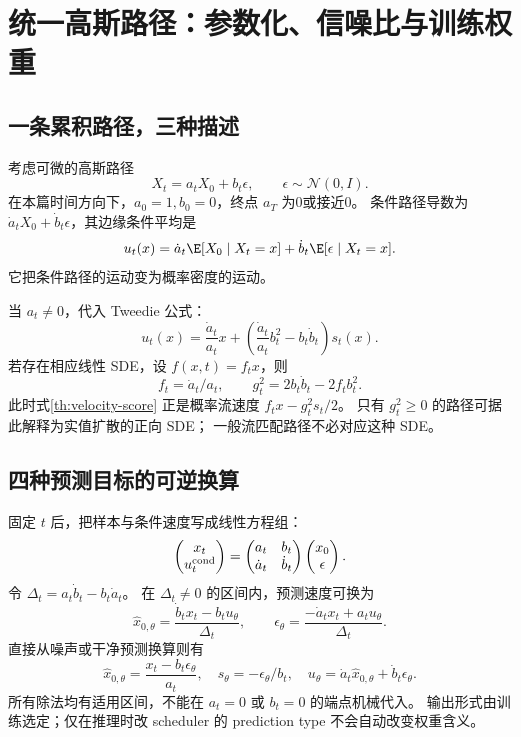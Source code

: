 \chapter{统一高斯路径：参数化、信噪比与训练权重}
\label{th:unification}

\section{一条累积路径，三种描述}

考虑可微的高斯路径
\begin{equation}\label{th:affine-path}
X_t=a_tX_0+b_t\epsilon,\qquad \epsilon\sim\mathcal N(0,I).
\end{equation}
在本篇时间方向下，$a_0=1,b_0=0$，终点 $a_T$ 为0或接近0。
条件路径导数为 $\dot a_tX_0+\dot b_t\epsilon$，其边缘条件平均是
\begin{equation}\label{th:marginal-velocity}
u_t(x)=\dot a_t\E[X_0\mid X_t=x]+\dot b_t\E[\epsilon\mid X_t=x].
\end{equation}
它把条件路径的运动变为概率密度的运动。

当 $a_t\ne0$，代入 Tweedie 公式：
\begin{equation}\label{th:velocity-score}
u_t(x)=\frac{\dot a_t}{a_t}x+
 \left(\frac{\dot a_t}{a_t}b_t^2-b_t\dot b_t\right)s_t(x).
\end{equation}
若存在相应线性 SDE，设 $f(x,t)=f_t x$，则
\[
f_t=\dot a_t/a_t,\qquad
g_t^2=2b_t\dot b_t-2f_tb_t^2.
\]
此时式\eqref{th:velocity-score} 正是概率流速度 $f_tx-g_t^2s_t/2$。
只有 $g_t^2\geq0$ 的路径可据此解释为实值扩散的正向 SDE；
一般流匹配路径不必对应这种 SDE。

\section{四种预测目标的可逆换算}

固定 $t$ 后，把样本与条件速度写成线性方程组：
\[
\begin{pmatrix}x_t\\u_t^{\rm cond}\end{pmatrix}
=\begin{pmatrix}a_t&b_t\\\dot a_t&\dot b_t\end{pmatrix}
\begin{pmatrix}x_0\\\epsilon\end{pmatrix}.
\]
令 $\Delta_t=a_t\dot b_t-b_t\dot a_t$。
在 $\Delta_t\ne0$ 的区间内，预测速度可换为
\begin{equation}\label{th:velocity-conversion}
\hat x_{0,\theta}=\frac{\dot b_tx_t-b_tu_\theta}{\Delta_t},
\qquad
\epsilon_\theta=\frac{-\dot a_tx_t+a_tu_\theta}{\Delta_t}.
\end{equation}
直接从噪声或干净预测换算则有
\[
\hat x_{0,\theta}=\frac{x_t-b_t\epsilon_\theta}{a_t},\quad
s_\theta=-\epsilon_\theta/b_t,\quad
u_\theta=\dot a_t\hat x_{0,\theta}+\dot b_t\epsilon_\theta.
\]
所有除法均有适用区间，不能在 $a_t=0$ 或 $b_t=0$ 的端点机械代入。
输出形式由训练选定；仅在推理时改 scheduler 的 prediction type 不会自动改变权重含义。

